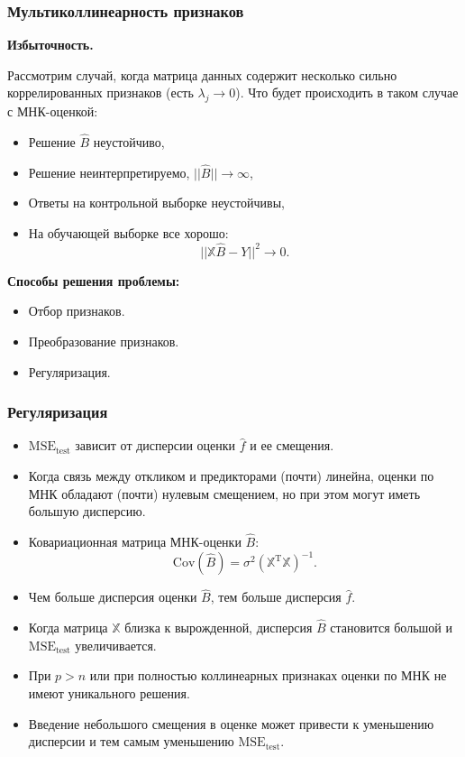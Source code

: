 \documentclass[10pt,unicode, notheorems]{beamer}
\DeclareMathOperator{\T}{T}
\begin{document}
\begin{frame}
\frametitle{Мультиколлинеарность признаков}
\textbf{Избыточность.}

Рассмотрим случай, когда матрица данных содержит несколько сильно коррелированных признаков (есть $\lambda_{j}\rightarrow0$). Что будет происходить в таком случае с МНК-оценкой:
\begin{itemize}
\item Решение $\hat{B}$  неустойчиво, 
\item Решение неинтерпретируемо,  $||\hat{B}||\rightarrow\infty$,
\item Ответы на контрольной выборке неустойчивы,
\item На обучающей выборке все хорошо:
\begin{equation*}
||\mathbb{X}\hat{B}-Y||^{2}
\rightarrow0.
\end{equation*}
\end{itemize}
\textbf{Способы решения проблемы:}
\begin{itemize}
\item Отбор признаков.
\item Преобразование признаков.
\item Регуляризация.
\end{itemize}
\end{frame}


\begin{frame}
\frametitle{Регуляризация}

\begin{itemize}
\item  $\mathrm{MSE}_{\mathrm{test}}$ зависит от дисперсии оценки $\hat{f}$ и ее смещения.
\item Когда связь между откликом и предикторами (почти) линейна, оценки по МНК обладают (почти) нулевым смещением, но при этом могут иметь большую дисперсию. 
\item Ковариационная матрица МНК-оценки $\hat{B}$: 
\begin{equation*}
\mathrm{Cov}(\hat{B}) = \sigma^2(\mathbb{X}^{\T}\mathbb{X})^{-1}.
\end{equation*}
\item Чем больше дисперсия оценки $\hat{B}$, тем больше дисперсия $\hat{f}$. 
\item Когда матрица $\mathbb{X}$ близка к вырожденной, дисперсия $\hat{B}$ становится большой и $\mathrm{MSE}_{\mathrm{test}}$ увеличивается.  
\item При $p>n$ или при полностью коллинеарных признаках оценки по МНК не имеют уникального решения.
\item Введение небольшого смещения в оценке может привести к уменьшению дисперсии и тем самым уменьшению $\mathrm{MSE}_{\text{test}}$.
\end{itemize}

\end{frame}
\end{document}
